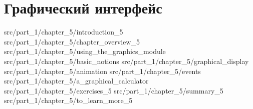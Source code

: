 \chapter{Графический интерфейс}

 {src/part_1/chapter_5/introduction_5}
 {src/part_1/chapter_5/chapter_overview_5}
 {src/part_1/chapter_5/using_the_graphics_module}
 {src/part_1/chapter_5/basic_notions}
 {src/part_1/chapter_5/graphical_display}
 {src/part_1/chapter_5/animation}
 {src/part_1/chapter_5/events}
 {src/part_1/chapter_5/a_graphical_calculator}
 {src/part_1/chapter_5/exercises_5}
 {src/part_1/chapter_5/summary_5}
 {src/part_1/chapter_5/to_learn_more_5}